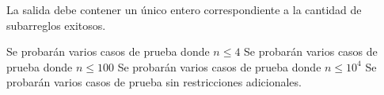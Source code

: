 \documentclass{oci}
\begin{document}
\begin{outputDescription}
La salida debe contener un único entero correspondiente a la cantidad
de subarreglos exitosos.
\end{outputDescription}

\begin{scoreDescription}
	 Se probarán varios casos de prueba donde $n \leq 4$
	 Se probarán varios casos de prueba donde $n \leq 100$
  	 Se probarán varios casos de prueba donde $n \leq 10^4$
	 Se probarán varios casos de prueba sin restricciones adicionales.
\end{scoreDescription}

\begin{sampleDescription}
\end{sampleDescription}
\end{document}
